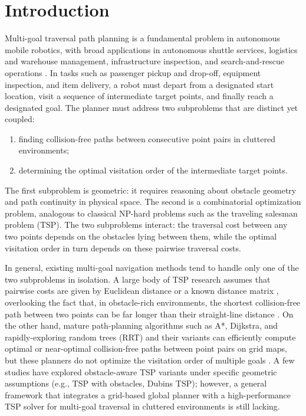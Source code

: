 \documentclass[lettersize,journal]{IEEEtran}
\begin{document}
\section{Introduction}

Multi-goal traversal path planning is a fundamental problem in autonomous mobile robotics, with broad applications in autonomous shuttle services, logistics and warehouse management, infrastructure inspection, and search-and-rescue operations \textcolor{blue}{\cite{ref1,ref2,ref33,ref37,ref38}}. In tasks such as passenger pickup and drop-off, equipment inspection, and item delivery, a robot must depart from a designated start location, visit a sequence of intermediate target points, and finally reach a designated goal. The planner must address two subproblems that are distinct yet coupled:

\begin{enumerate}

\item finding collision-free paths between consecutive point pairs in cluttered environments;

\item determining the optimal visitation order of the intermediate target points.

\end{enumerate}

The first subproblem is geometric: it requires reasoning about obstacle geometry and path continuity in physical space. The second is a combinatorial optimization problem, analogous to classical NP-hard problems such as the traveling salesman problem (TSP). The two subproblems interact: the traversal cost between any two points depends on the obstacles lying between them, while the optimal visitation order in turn depends on these pairwise traversal costs.

In general, existing multi-goal navigation methods tend to handle only one of the two subproblems in isolation. A large body of TSP research assumes that pairwise costs are given by Euclidean distance or a known distance matrix \textcolor{blue}{\cite{ref4,ref36}}, overlooking the fact that, in obstacle-rich environments, the shortest collision-free path between two points can be far longer than their straight-line distance \textcolor{blue}{\cite{ref39}}. On the other hand, mature path-planning algorithms such as A*, Dijkstra, and rapidly-exploring random trees (RRT) and their variants can efficiently compute optimal or near-optimal collision-free paths between point pairs on grid maps, but these planners do not optimize the visitation order of multiple goals \textcolor{blue}{\cite{ref5,ref6,ref7}}. A few studies have explored obstacle-aware TSP variants under specific geometric assumptions (e.g., TSP with obstacles, Dubins TSP); however, a general framework that integrates a grid-based global planner with a high-performance TSP solver for multi-goal traversal in cluttered environments is still lacking.
\end{document}
